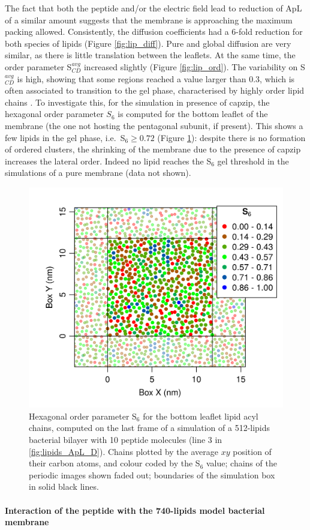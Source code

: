 The fact that both the peptide and/or the electric field lead to reduction of ApL of a similar amount suggests that the membrane is approaching the maximum packing allowed.
%
Consistently, the diffusion coefficients had a 6-fold reduction for both species of lipids (Figure \ref{fig:lip_diff}). Pure and global diffusion are very similar, as there is little translation between the leaflets.
%
At the same time, the order parameter S$^{avg}_{CD}$ increased slightly (Figure \ref{fig:lip_ord}). The variability on S$^{avg}_{CD}$ is high, showing that some regions reached a value larger than 0.3, which is often associated to transition to the gel phase, characterised by highly order lipid chains \citep{Pluhackova2016}.
%
To investigate this, for the simulation in presence of capzip, the hexagonal order parameter $S_6$ is computed for the bottom leaflet of the membrane (the one not hosting the pentagonal subunit, if present). This shows a few lipids in the gel phase, i.e.\ S$_6 \ge 0.72$ (Figure \ref{fig:S6_pb4}): despite there is no formation of ordered clusters, the shrinking of the membrane due to the presence of capzip increases the lateral order. Indeed no lipid reaches the S$_6$ gel threshold in the simulations of a pure membrane (data not shown).
%
\begin{figure}[h!]
\centering
\includegraphics[width=0.5\linewidth]{3results_capsule/pics/pb4_S6.png} 
\caption[Lipid hexagonal order parameter in an atomistic protein-lipid simulation]{Hexagonal order parameter S$_6$ for the bottom leaflet lipid acyl chains, computed on the last frame of a simulation of a 512-lipids bacterial bilayer with 10 peptide molecules (line 3 in \ref{fig:lipids_ApL_D}). Chains plotted by the average $xy$ position of their carbon atoms, and colour coded by the S$_6$ value; chains of the periodic images shown faded out; boundaries of the simulation box in solid black lines.}
\label{fig:S6_pb4}
\end{figure}

\paragraph{Interaction of the peptide with the 740-lipids model bacterial membrane}

